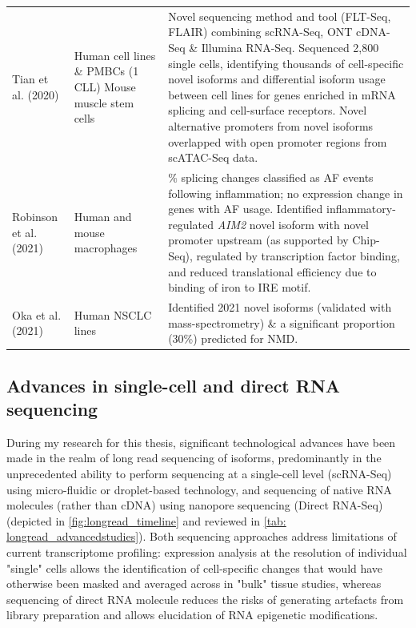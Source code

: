 \begin{landscape}
\begin{longtable}[c]{p{4cm}p{4cm}p{18cm}}
		
		\centering Tian et al. (2020) \cite{Tian2020} &
		\centering Human cell lines \& PMBCs (1 CLL) \newline Mouse muscle stem cells &
		\tabitem Novel sequencing method and tool (FLT-Seq, FLAIR) combining scRNA-Seq, ONT cDNA-Seq \& Illumina RNA-Seq. \newline 
		\tabitem Sequenced 2,800 single cells, identifying thousands of cell-specific novel isoforms and differential isoform usage between cell lines for genes enriched in mRNA splicing and cell-surface receptors. \newline 
		\tabitem Novel alternative promoters from novel isoforms overlapped with open promoter regions from scATAC-Seq data.\\
		\hdashline[0.5pt/5pt]
		
		
		\centering Robinson et al. (2021) \cite{Robinson2021} &
		\centering Human and mouse macrophages &
		\tabitem 50\% splicing changes classified as AF events following inflammation; no expression change in genes with AF usage. \newline 
		\tabitem Identified inflammatory-regulated \textit{AIM2} novel isoform with novel promoter upstream (as supported by Chip-Seq), regulated by transcription factor binding, and reduced translational efficiency due to binding of iron to IRE motif. \\
		\hdashline[0.5pt/5pt]
		
		\centering Oka et al. (2021) \cite{Oka2021} &
		\centering Human NSCLC lines &
		\tabitem Identified 2021 novel isoforms (validated with mass-spectrometry) \& a significant proportion (30\%) predicted for NMD. \\* \bottomrule
	\end{longtable}
\end{landscape}
\restoregeometry



\subsection{Advances in single-cell and direct RNA sequencing}
During my research for this thesis, significant technological advances have been made in the realm of long read sequencing of isoforms, predominantly in the unprecedented ability to perform sequencing at a single-cell level (scRNA-Seq) using micro-fluidic or droplet-based technology, and sequencing of native RNA molecules (rather than cDNA) using nanopore sequencing (Direct RNA-Seq) (depicted in \cref{fig:longread_timeline} and reviewed in \cref{tab: longread_advancedstudies}). Both sequencing approaches address limitations of current transcriptome profiling: expression analysis at the resolution of individual "single" cells allows the identification of cell-specific changes that would have otherwise been masked and averaged across in "bulk" tissue studies, whereas sequencing of direct RNA molecule reduces the risks of generating artefacts from library preparation and allows elucidation of RNA epigenetic modifications\cite{Bayega2018}. 

